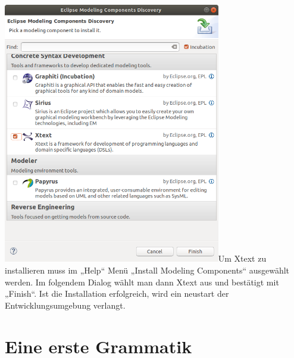 \documentclass[]{article}
\begin{document}
\includegraphics[width=3.73660in,height=4.50470in]{./Pictures/1000020100000265000002E3C3D1AD84052DE450.png}Um
Xtext zu installieren muss im „Help`` Menü „Install Modeling
Components`` ausgewählt werden. Im folgendem Dialog wählt man dann Xtext
aus und bestätigt mit „Finish``. Ist die Installation erfolgreich, wird
ein neustart der Entwicklungsumgebung verlangt.

\section[Eine erste
Grammatik]{\texorpdfstring{\protect\hypertarget{anchor-17}{}{}Eine erste
Grammatik}{Eine erste Grammatik}}\label{eine-erste-grammatik}
\end{document}
